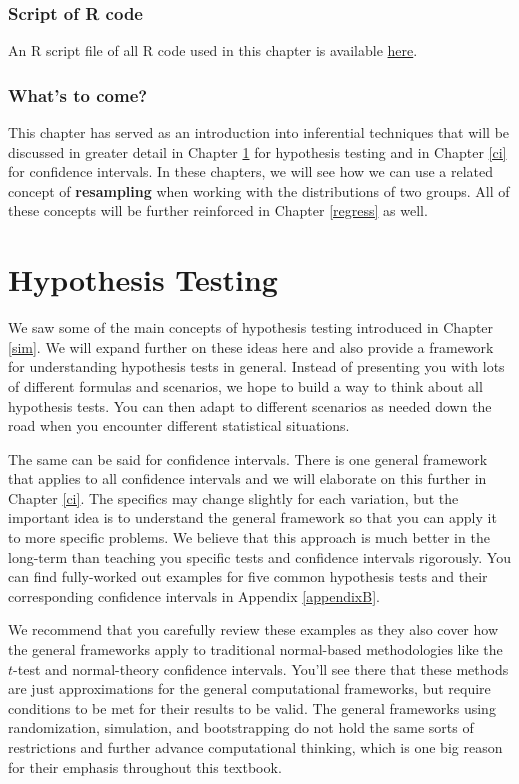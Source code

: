 \documentclass[]{tufte-book}
\begin{document}
\subsection{Script of R code}\label{script-of-r-code-2}

An R script file of all R code used in this chapter is available
\href{http://ismayc.github.io/moderndiver-book/scripts/06-sim.R}{here}.

\subsection{What's to come?}\label{whats-to-come-3}

This chapter has served as an introduction into inferential techniques
that will be discussed in greater detail in Chapter \ref{hypo} for
hypothesis testing and in Chapter \ref{ci} for confidence intervals. In
these chapters, we will see how we can use a related concept of
\textbf{resampling} when working with the distributions of two groups.
All of these concepts will be further reinforced in Chapter
\ref{regress} as well.

\chapter{Hypothesis Testing}\label{hypo}

We saw some of the main concepts of hypothesis testing introduced in
Chapter \ref{sim}. We will expand further on these ideas here and also
provide a framework for understanding hypothesis tests in general.
Instead of presenting you with lots of different formulas and scenarios,
we hope to build a way to think about all hypothesis tests. You can then
adapt to different scenarios as needed down the road when you encounter
different statistical situations.

The same can be said for confidence intervals. There is one general
framework that applies to all confidence intervals and we will elaborate
on this further in Chapter \ref{ci}. The specifics may change slightly
for each variation, but the important idea is to understand the general
framework so that you can apply it to more specific problems. We believe
that this approach is much better in the long-term than teaching you
specific tests and confidence intervals rigorously. You can find
fully-worked out examples for five common hypothesis tests and their
corresponding confidence intervals in Appendix \ref{appendixB}.

We recommend that you carefully review these examples as they also cover
how the general frameworks apply to traditional normal-based
methodologies like the \(t\)-test and normal-theory confidence
intervals. You'll see there that these methods are just approximations
for the general computational frameworks, but require conditions to be
met for their results to be valid. The general frameworks using
randomization, simulation, and bootstrapping do not hold the same sorts
of restrictions and further advance computational thinking, which is one
big reason for their emphasis throughout this textbook.
\end{document}
